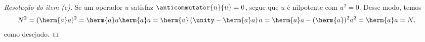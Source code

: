 \begin{proof}[Resolução do item (c)]
    Se um operador \(u\) satisfaz \(\anticommutator{u}{u} = 0\), segue que \(u\) é nilpotente com \(u^2 = 0\). Desse modo, temos
    \begin{equation*}
        N^2 = (\herm{a}a)^2 = \herm{a}a\herm{a}a = \herm{a}\left(\unity - \herm{a}a\right)a = \herm{a}a - (\herm{a})^2a^2 = \herm{a}a = N,
    \end{equation*}
    como desejado.
\end{proof}
